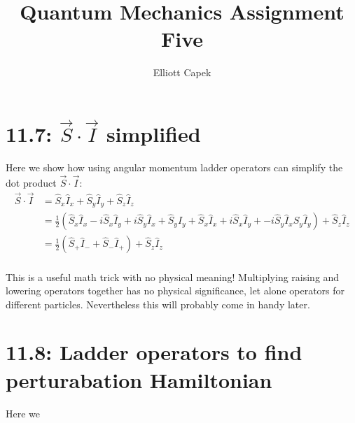 \documentclass[10pt]{article} %
\title{Quantum Mechanics Assignment Five}
\author{Elliott Capek}
\begin{document}
\maketitle{}

\section{11.7: $\vec{S} \cdot \vec{I}$ simplified}

Here we show how using angular momentum ladder operators can simplify the dot product
$\vec{S} \cdot \vec{I}$:\\

\begin{align*}
  \vec{S} \cdot \vec{I} &= \hat{S}_x\hat{I}_x + \hat{S}_y\hat{I}_y + \hat{S}_z\hat{I}_z\\
  &= \frac{1}{2}\left(\hat{S}_x\hat{I}_x -i\hat{S}_x\hat{I}_y + i\hat{S}_y\hat{I}_x
  + \hat{S}_y\hat{I}_y + \hat{S}_x\hat{I}_x + i\hat{S}_x\hat{I}_y
  + -i\hat{S}_y\hat{I}_x\hat{S}_y\hat{I}_y\right)
  + \hat{S}_z\hat{I}_z\\
  &= \frac{1}{2}\left(\hat{S}_+\hat{I}_- + \hat{S}_-\hat{I}_+\right) + \hat{S}_z\hat{I}_z\\
\end{align*}

This is a useful math trick with no physical meaning! Multiplying raising and lowering operators
together has no physical significance, let alone operators for different particles. Nevertheless
this will probably come in handy later.\\

\section{11.8: Ladder operators to find perturabation Hamiltonian}

Here we

\begin{align*}
  
\end{align*}
\end{document}
